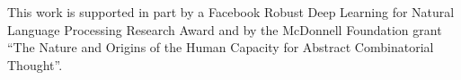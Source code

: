 This work is supported in part by a Facebook Robust Deep Learning for Natural Language Processing Research Award and by the McDonnell Foundation grant ``The Nature and Origins of the Human Capacity for Abstract Combinatorial Thought''.
